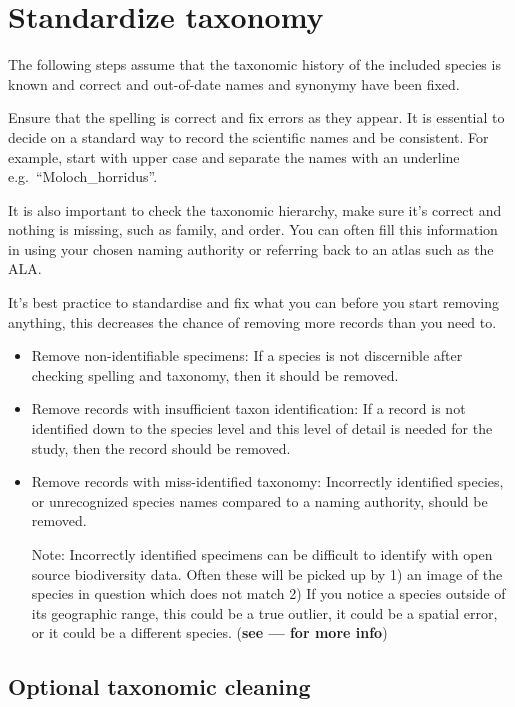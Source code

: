 \documentclass[
  letterpaper,
  DIV=11,
  numbers=noendperiod,
  oneside]{scrreprt}
\begin{document}
\hypertarget{standardize-taxonomy}{%
\section{Standardize taxonomy}\label{standardize-taxonomy}}

The following steps assume that the taxonomic history of the included
species is known and correct and out-of-date names and synonymy have
been fixed.

Ensure that the spelling is correct and fix errors as they appear. It is
essential to decide on a standard way to record the scientific names and
be consistent. For example, start with upper case and separate the names
with an underline e.g.~``Moloch\_horridus''.

It is also important to check the taxonomic hierarchy, make sure it's
correct and nothing is missing, such as family, and order. You can often
fill this information in using your chosen naming authority or referring
back to an atlas such as the ALA.

It's best practice to standardise and fix what you can before you start
removing anything, this decreases the chance of removing more records
than you need to.

\begin{itemize}
\item
  Remove non-identifiable specimens: If a species is not discernible
  after checking spelling and taxonomy, then it should be removed.
\item
  Remove records with insufficient taxon identification: If a record is
  not identified down to the species level and this level of detail is
  needed for the study, then the record should be removed.
\item
  Remove records with miss-identified taxonomy: Incorrectly identified
  species, or unrecognized species names compared to a naming authority,
  should be removed.

  Note: Incorrectly identified specimens can be difficult to identify
  with open source biodiversity data. Often these will be picked up by
  1) an image of the species in question which does not match 2) If you
  notice a species outside of its geographic range, this could be a true
  outlier, it could be a spatial error, or it could be a different
  species. (\textbf{see --- for more info})
\end{itemize}

\hypertarget{optional-taxonomic-cleaning}{%
\subsection{Optional taxonomic
cleaning}\label{optional-taxonomic-cleaning}}
\end{document}

